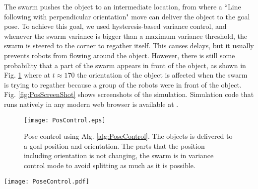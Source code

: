 The swarm pushes the object to an intermediate location, from where a ``Line following with perpendicular orientation" move can deliver the object to the goal pose. 
To achieve this goal, we used hysteresis-based variance control, and whenever the swarm variance is bigger than a maximum variance threshold, the swarm is steered to  the corner to regather itself. 
This causes delays, but it usually prevents robots from flowing around the object. However, there is still some probability that a part of the swarm appears in front of the object, as shown in Fig. \ref{fig:PosControlFig} where at $t\approx170$ the orientation of the object is affected when the swarm is trying to regather because a group of the robots were in front of the object. Fig. \ref{fig:PosScreenShot} shows screenshots of the simulation. Simulation code that runs natively in any modern web browser is available at \cite{Shahrokhi16pose}.

\begin{figure}
\begin{center}
	\texttt{[image: PosControl.eps]}
\end{center}
\vspace{-2em}
\caption{\label{fig:PosControlFig} 
Pose control using Alg. \ref{alg:PoseControl}.  The objects is delivered to a goal position and orientation. The parts that the position including orientation is not changing, the swarm is in variance control mode to avoid splitting as much as it is possible. 
}
\vspace{-1em}
\end{figure}


\begin{figure*}
\centering

\texttt{[image: PoseControl.pdf]}
\vspace{0em}
\caption{\label{fig:PosScreenShot}
Different stages for position control of a block while controlling its orientation. The first task (0--90 s) is to push the object COM to a line perpendicular to the goal. The second task (90--210 s) is to push the object along this perpendicular line while regulating the orientation.
}
\end{figure*}


